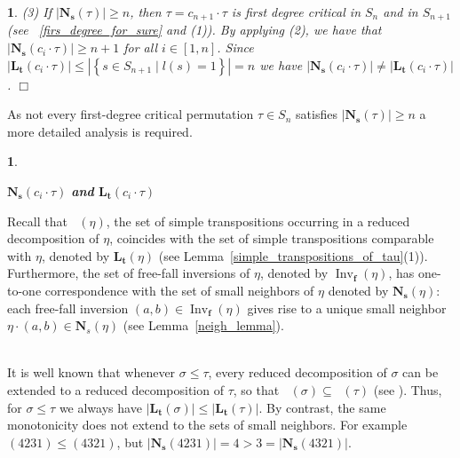 \documentclass[a4 paper,12pt]{article}
\newcommand{\ma}{\leqslant}
\DeclareMathOperator{\Inv}{Inv}
\DeclareMathOperator{\Red}{R_{\textbf{d}}}
\newtheorem{numeris}{}[section]
\newtheorem{subnum}{}[numeris]
\begin{document}
\begin{subnum}
(3) If $\left|\textbf{N}_{\textbf{s}}( \tau)\right|\geq n$, then $\tau = c_{n+1}\cdot  \tau $ is first degree critical  in $S_{n}$ and  in $S_{n+1}$  (see ~\ref{firs_degree_for_sure} and (1)).  By applying  (2),  we have that  $\left|\textbf{N}_{\textbf{s}}(c_{i}\cdot  \tau)\right| \geq n+1$ for all $i\in \left[1,n\right]$. Since $\left|\textbf{L}_{\textbf{t}}(c_{i}\cdot  \tau)\right| \leq \left|\left\{s \in S_{n+1} \mid l(s)=1\right\}\right| =n$ we have  $\left|\textbf{N}_{\textbf{s}}(c_{i}\cdot  \tau)\right| \neq \left|\textbf{L}_{\textbf{t}}(c_{i}\cdot  \tau)\right|$.
 \hfill $\Box$ 
	
	\label{if_larger_n_then_critical}
\end{subnum}


















 As not every first-degree critical permutation $\tau\in S_n$ satisfies $\left|\textbf{N}_{\textbf{s}}(\tau)\right| \geq n$ a more detailed analysis is required.




\begin{numeris}\begin{center}$\textbf{N}_{\textbf{s}}(c_i\cdot\tau)$ \textbf{and} $\textbf{L}_{\textbf{t}}(c_i\cdot \tau)$\end{center}\end{numeris}
\begin{small}Recall that $\Red(\eta)$, the set of simple transpositions occurring in a reduced decomposition of $\eta$, coincides with the set of simple transpositions comparable with $\eta$, denoted by $\textbf{L}_{\textbf{t}}(\eta)$ (see Lemma~\ref{simple_transpositions_of_tau}(1)).
Furthermore, the set of free-fall inversions of $\eta$, denoted by $\Inv_{\textbf{f}}(\eta)$, has one-to-one correspondence  with the set of small neighbors of $\eta$ denoted by $\mathbf{N}_{\textbf{s}}(\eta)$: each free-fall inversion $(a,b)\in \Inv_{\textbf{f}}(\eta)$ gives rise to a unique small neighbor $\eta\cdot (a,b)\in \mathbf{N}_s(\eta)$ (see Lemma~\ref{neigh_lemma}).\end{small}\\



It is well known that whenever $\sigma \ma \tau$,  every reduced decomposition of $\sigma$ can be extended to a reduced decomposition of $\tau$, so that $\Red(\sigma) \subseteq \Red(\tau)$ (see \cite[Theorem 2.2.2]{Bjor}). 
Thus, for  $\sigma \ma \tau$ we always have $\left|\textbf{L}_{\textbf{t}}(\sigma)\right| \leq \left|\textbf{L}_{\textbf{t}}(\tau)\right|$. By contrast, the same monotonicity does not extend to the sets of  small neighbors. For example $(4231) \ma (4321)$, but $ \left|\mathbf{N}_{\textbf{s}}(4231) \right|= 4 > 3= \left|\mathbf{N}_{\textbf{s}}(4321)\right|$.
\end{document}
